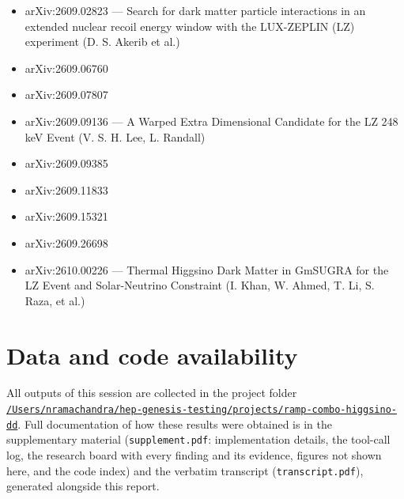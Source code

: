 \documentclass[11pt,a4paper]{article}
\begin{document}
\begin{itemize}
\item arXiv:2609.02823 --- Search for dark matter particle interactions in an extended nuclear recoil energy window with the LUX-ZEPLIN (LZ) experiment (D. S. Akerib et al.)
\item arXiv:2609.06760
\item arXiv:2609.07807
\item arXiv:2609.09136 --- A Warped Extra Dimensional Candidate for the LZ 248 keV Event (V. S. H. Lee, L. Randall)
\item arXiv:2609.09385
\item arXiv:2609.11833
\item arXiv:2609.15321
\item arXiv:2609.26698
\item arXiv:2610.00226 --- Thermal Higgsino Dark Matter in GmSUGRA for the LZ Event and Solar-Neutrino Constraint (I. Khan, W. Ahmed, T. Li, S. Raza, et al.)
\end{itemize}

\section*{Data and code availability}
All outputs of this session are collected in the project folder \href{file:///Users/nramachandra/hep-genesis-testing/projects/ramp-combo-higgsino-dd}{\texttt{/\allowbreak{}Users/\allowbreak{}nramachandra/\allowbreak{}hep-genesis-testing/\allowbreak{}projects/\allowbreak{}ramp-combo-higgsino-dd}}.
Full documentation of how these results were obtained is in the supplementary material (\texttt{supplement.pdf}: implementation details, the tool-call log, the research board with every finding and its evidence, figures not shown here, and the code index) and the verbatim transcript (\texttt{transcript.pdf}), generated alongside this report.
\end{document}

